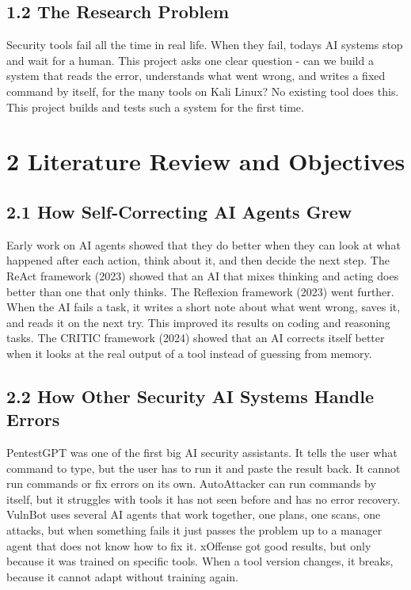 \documentclass[
]{article}
\begin{document}
\hypertarget{the-research-problem}{%
\subsection{1.2 The Research Problem}\label{the-research-problem}}

Security tools fail all the time in real life. When they fail,
today\textquotesingle s AI systems stop and wait for a human. This
project asks one clear question - can we build a system that reads the
error, understands what went wrong, and writes a fixed command by
itself, for the many tools on Kali Linux? No existing tool does this.
This project builds and tests such a system for the first time.

\hypertarget{literature-review-and-objectives}{%
\section{2 Literature Review and
Objectives}\label{literature-review-and-objectives}}

\hypertarget{how-self-correcting-ai-agents-grew}{%
\subsection{2.1 How Self-Correcting AI Agents
Grew}\label{how-self-correcting-ai-agents-grew}}

Early work on AI agents showed that they do better when they can look at
what happened after each action, think about it, and then decide the
next step. The ReAct framework (2023) showed that an AI that mixes
thinking and acting does better than one that only thinks. The Reflexion
framework (2023) went further. When the AI fails a task, it writes a
short note about what went wrong, saves it, and reads it on the next
try. This improved its results on coding and reasoning tasks. The CRITIC
framework (2024) showed that an AI corrects itself better when it looks
at the real output of a tool instead of guessing from memory.

\hypertarget{how-other-security-ai-systems-handle-errors}{%
\subsection{2.2 How Other Security AI Systems Handle
Errors}\label{how-other-security-ai-systems-handle-errors}}

PentestGPT was one of the first big AI security assistants. It tells the
user what command to type, but the user has to run it and paste the
result back. It cannot run commands or fix errors on its own.
AutoAttacker can run commands by itself, but it struggles with tools it
has not seen before and has no error recovery. VulnBot uses several AI
agents that work together, one plans, one scans, one attacks, but when
something fails it just passes the problem up to a manager agent that
does not know how to fix it. xOffense got good results, but only because
it was trained on specific tools. When a tool version changes, it
breaks, because it cannot adapt without training again.
\end{document}

